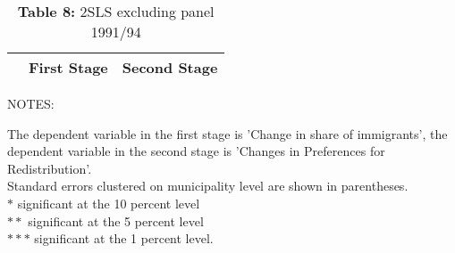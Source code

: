 \documentclass[12pt,a4paper]{standalone}
\newcommand\tab[1][1cm]{\hspace*{#1}}
\newcommand\tabs[1][0.8cm]{\hspace*{#1}}
\newcommand\tabu[1][0.4cm]{\hspace*{#1}}
\begin{document}
\begin{minipage}[c][24cm]{1.3 \textwidth}

\thispagestyle{empty}

\begin{table}
\centering
\caption*{\textbf{Table 8:} 2SLS excluding panel 1991/94}

\begin{threeparttable}
\begin{tabular}{lll}

    \toprule

    & First Stage & Second Stage  \\ 
    \midrule
 

    \bottomrule
\end{tabular}

    \begin{tablenotes}
    \item NOTES:
	\par
	\begingroup
	\leftskip=0.3cm %
	\noindent 
	The dependent variable in the first stage is 				'Change in share of immigrants', the dependent 				variable in the second stage is 'Changes in 				Preferences for Redistribution'. \\
    Standard errors clustered on municipality level are 		shown in parentheses. \\
    $ \ast $ \tab significant at the 10 percent level \\
    $ \ast \ast $ \tabs significant at the 5 percent level 	\\
    $ \ast \ast \ast $ \tabu significant at the 1 percent 		level.
	\par
	\endgroup




    \end{tablenotes}
\end{threeparttable}
\end{table}

\end{minipage}
\end{document}
